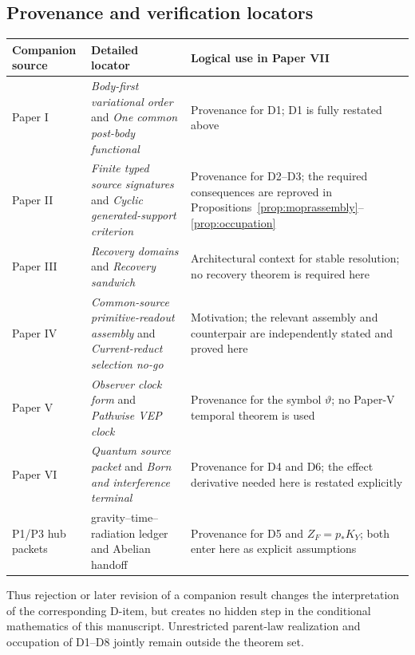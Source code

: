 \documentclass[11pt]{article}
\begin{document}
\subsection*{Provenance and verification locators}

\begin{center}
\small
\begin{tabularx}{0.96\textwidth}{@{}p{}p{}X@{}}
\toprule
Companion source & Detailed locator & Logical use in Paper VII\\
\midrule
Paper I & \emph{Body-first variational order} and \emph{One common post-body
functional} & Provenance for D1; D1 is fully restated above\\
Paper II & \emph{Finite typed source signatures} and \emph{Cyclic
generated-support criterion} & Provenance for D2--D3; the required
consequences are reproved in
Propositions~\ref{prop:moprassembly}--\ref{prop:occupation}\\
Paper III & \emph{Recovery domains} and \emph{Recovery sandwich} &
Architectural context for stable resolution; no recovery theorem is required
here\\
Paper IV & \emph{Common-source primitive-readout assembly} and
\emph{Current-reduct selection no-go} & Motivation; the relevant assembly and
counterpair are independently stated and proved here\\
Paper V & \emph{Observer clock form} and \emph{Pathwise VEP clock} &
Provenance for the symbol $\vartheta$; no Paper-V temporal theorem is used\\
Paper VI & \emph{Quantum source packet} and \emph{Born and interference
terminal} & Provenance for D4 and D6; the effect derivative needed here is
restated explicitly\\
P1/P3 hub packets & gravity--time--radiation ledger and Abelian handoff &
Provenance for D5 and $Z_F=p_*K_Y$; both enter here as explicit assumptions\\
\bottomrule
\end{tabularx}
\end{center}

Thus rejection or later revision of a companion result changes the
interpretation of the corresponding D-item, but creates no hidden step in the
conditional mathematics of this manuscript.  Unrestricted parent-law
realization and occupation of D1--D8 jointly remain outside the theorem set.

\begingroup
\small


\endgroup
\end{document}

